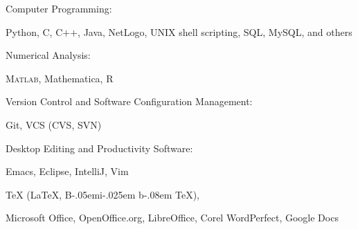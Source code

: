 \documentclass[10pt]{article}
\newcommand{\halfblankline}{\quad\vspace{-0.5\baselineskip}\pagebreak[3]}
\providecommand\BibTeX{{B\kern-.05em{\sc i\kern-.025em b}\kern-.08em \TeX}}
\providecommand\Matlab{\textsc{Matlab}}
\begin{document}
Computer Programming:
%
\begin{innerlist}
\item Python, C, C$+$$+$, Java, NetLogo, UNIX shell scripting, SQL, MySQL, and others
\end{innerlist}

\halfblankline

Numerical Analysis:
%
\begin{innerlist}
    \item \Matlab, Mathematica, R 
\end{innerlist}

\halfblankline

Version Control and Software Configuration Management:
%
\begin{innerlist}
    \item Git, VCS (CVS, SVN)
\end{innerlist}

\halfblankline

%
%

%

%

Desktop Editing and Productivity Software:
%
\begin{innerlist}
    \item Emacs, Eclipse, IntelliJ, Vim
    \item \TeX{} (\LaTeX{}, \BibTeX{}),
    \item Microsoft Office, OpenOffice.org, LibreOffice, Corel
        WordPerfect, Google Docs
\end{innerlist}
\end{document}

